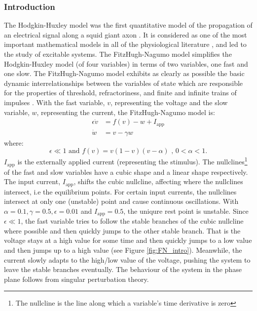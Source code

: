 \documentclass[a4paper, 12pt]{article}
\begin{document}
\subsubsection{Introduction}
The Hodgkin-Huxley model\cite{huxley} was the first quantitative model of the propagation of an electrical signal along a squid giant axon \cite{keener}. It is considered as one of the most important mathematical models in all of the physiological literature \cite{keener}, and led to the study of excitable systems.  The FitzHugh-Nagumo model simplifies the Hodgkin-Huxley model (of four variables) in terms of two variables, one fast and one slow. The FitzHugh-Nagumo model exhibits as clearly as possible the basic dynamic interrelationships between the variables of state which are responsible for the properties of threshold, refractoriness, and finite and infinite trains of impulses \cite{fitzhugh}.  With the fast variable, $v$, representing the voltage and the slow variable, $w$, representing the current, the FitzHugh-Nagumo model is:
\begin{align}
\epsilon\dot{v} &= f(v) - w + I_\text{app}\\
\dot{w} &= v - \gamma w
\end{align}
where: 
\begin{equation*}
\epsilon \ll 1 \text{  and  } f(v) = v(1-v)(v-\alpha) \text{ , } 0 <\alpha<1 .
\end{equation*} 
$I_\text{app}$ is the externally applied current (representing the stimulus). The nullclines\footnote{The nullcline is the line along which a variable's time derivative is zero} of the fast and slow variables have a cubic shape and a linear shape respectively.   The input current, $I_\text{app}$, shifts the cubic nullcline, affecting where the nullclines intersect, i.e the equilibrium points. For certain input currents, the nullclines intersect at only one (unstable) point and cause continuous oscillations. With $\alpha =0.1, \gamma = 0.5, \epsilon = 0.01$ and $I_{\text{app}}=0.5$, the uniqure rest point is unstable. Since $\epsilon \ll 1 $, the fast variable tries to follow the stable branches of the cubic nullcline where possible and then quickly jumps to the other stable branch. That is the voltage stays at a high value for some time and then quickly jumps to a low value and then jumps up to a high value (see Figure \ref{fig:FN_intro}).  Meanwhile, the current slowly adapts to the high/low value of the voltage, pushing the system to leave the stable branches eventually. The behaviour of the system in the phase plane follows from singular perturbation theory\cite{keener}. 
\end{document}
